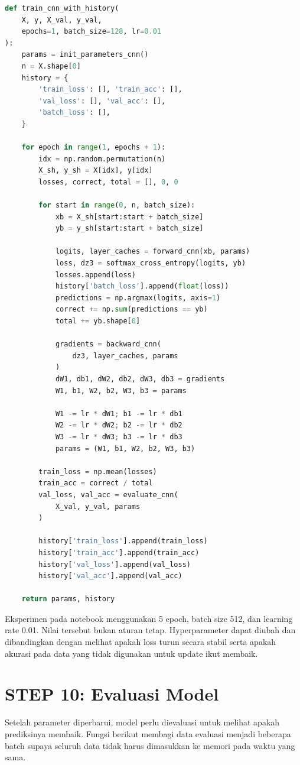 \documentclass[12pt, letterpaper]{article}
\begin{document}
\begin{lstlisting}[language=Python, caption=Training CNN menggunakan mini-batch gradient descent]
def train_cnn_with_history(
    X, y, X_val, y_val,
    epochs=1, batch_size=128, lr=0.01
):
    params = init_parameters_cnn()
    n = X.shape[0]
    history = {
        'train_loss': [], 'train_acc': [],
        'val_loss': [], 'val_acc': [],
        'batch_loss': [],
    }

    for epoch in range(1, epochs + 1):
        idx = np.random.permutation(n)
        X_sh, y_sh = X[idx], y[idx]
        losses, correct, total = [], 0, 0

        for start in range(0, n, batch_size):
            xb = X_sh[start:start + batch_size]
            yb = y_sh[start:start + batch_size]

            logits, layer_caches = forward_cnn(xb, params)
            loss, dz3 = softmax_cross_entropy(logits, yb)
            losses.append(loss)
            history['batch_loss'].append(float(loss))
            predictions = np.argmax(logits, axis=1)
            correct += np.sum(predictions == yb)
            total += yb.shape[0]

            gradients = backward_cnn(
                dz3, layer_caches, params
            )
            dW1, db1, dW2, db2, dW3, db3 = gradients
            W1, b1, W2, b2, W3, b3 = params

            W1 -= lr * dW1; b1 -= lr * db1
            W2 -= lr * dW2; b2 -= lr * db2
            W3 -= lr * dW3; b3 -= lr * db3
            params = (W1, b1, W2, b2, W3, b3)

        train_loss = np.mean(losses)
        train_acc = correct / total
        val_loss, val_acc = evaluate_cnn(
            X_val, y_val, params
        )

        history['train_loss'].append(train_loss)
        history['train_acc'].append(train_acc)
        history['val_loss'].append(val_loss)
        history['val_acc'].append(val_acc)

    return params, history
\end{lstlisting}

Eksperimen pada notebook menggunakan 5 epoch, batch size 512, dan learning rate 0.01. Nilai tersebut bukan aturan tetap. Hyperparameter dapat diubah dan dibandingkan dengan melihat apakah loss turun secara stabil serta apakah akurasi pada data yang tidak digunakan untuk update ikut membaik.

\section*{STEP 10: Evaluasi Model}
Setelah parameter diperbarui, model perlu dievaluasi untuk melihat apakah prediksinya membaik. Fungsi berikut membagi data evaluasi menjadi beberapa batch supaya seluruh data tidak harus dimasukkan ke memori pada waktu yang sama.
\end{document}

